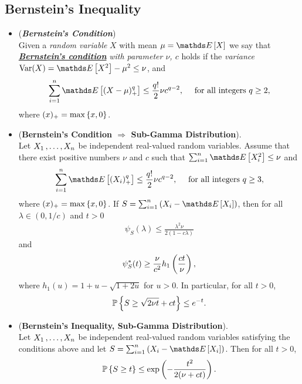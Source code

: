 \documentclass[11pt]{article}
\begin{document}
\subsection{Bernstein's Inequality}
\begin{itemize}
\item \begin{definition} (\textbf{\emph{Bernstein's Condition}}) \\
Given a \emph{random variable} $X$ with mean $\mu = \E{}{X}$ we say that \underline{\emph{\textbf{Bernstein's condition}}} \emph{with parameter $\nu$, $c$} holds if the \emph{variance} $\text{Var}(X) = \E{}{X^2} - \mu^2 \le \nu$, and
\begin{align*}
\sum_{i=1}^{n}\E{}{(X - \mu)_{+}^q} \le \frac{q!}{2} \nu c^{q-2}, \quad \text{ for all integers }q \ge 2,
\end{align*} where $(x)_{+} = \max\left\{x, 0\right\}$. 
\end{definition}

\item \begin{proposition}  (\textbf{Bernstein's Condition $\Rightarrow$  Sub-Gamma Distribution}).  \citep{boucheron2013concentration}\\
Let $X_1 \,{,}\ldots{,}\, X_n$ be independent real-valued random variables. Assume that there exist positive numbers  $\nu$ and $c$ such that
$\sum_{i=1}^{n}\E{}{X_i^2} \le \nu$ and
\begin{align*}
\sum_{i=1}^{n}\E{}{(X_i)_{+}^q} \le \frac{q!}{2} \nu c^{q-2}, \quad \text{ for all integers }q \ge 3,
\end{align*} where $(x)_{+} = \max\left\{x, 0\right\}$. If $S = \sum_{i=1}^{n}\paren{X_i - \E{}{X_i}}$, then for all $\lambda \in (0, 1/c)$ and $t > 0$
\begin{align*}
\psi_S(\lambda) \le \frac{\lambda^2 \nu}{2(1 - c\lambda)} 
\end{align*} and
\begin{align*}
\psi_S^{*}(t) \ge \frac{\nu}{c^2}h_1\left(\frac{ct}{\nu}\right),
\end{align*} where $h_1(u) = 1+ u - \sqrt{1 + 2u}$ for $u >0$. In particular, for all $t > 0$, 
\begin{align}
{\mathbb P}\left\{S \ge \sqrt{2\nu t} + ct \right\} \le e^{-t}. \label{ineqn: bernstein_inequality_gammar_dist_0}
\end{align}
\end{proposition}

\item \begin{corollary}(\textbf{Bernstein's Inequality, Sub-Gamma Distribution}).  \citep{boucheron2013concentration}\\
Let $X_1 \,{,}\ldots{,}\, X_n$ be independent real-valued random variables satisfying the conditions above and let $S = \sum_{i=1}^{n}\paren{X_i - \E{}{X_i}}$. Then for all $t > 0$,
\begin{align}
{\mathbb P}\left\{S \ge t \right\} \le \exp\left(- \frac{t^2}{2(\nu + ct)}\right).  \label{ineqn: bernstein_inequality_gammar_dist}
\end{align}
\end{corollary}


\end{itemize}
\end{document}
